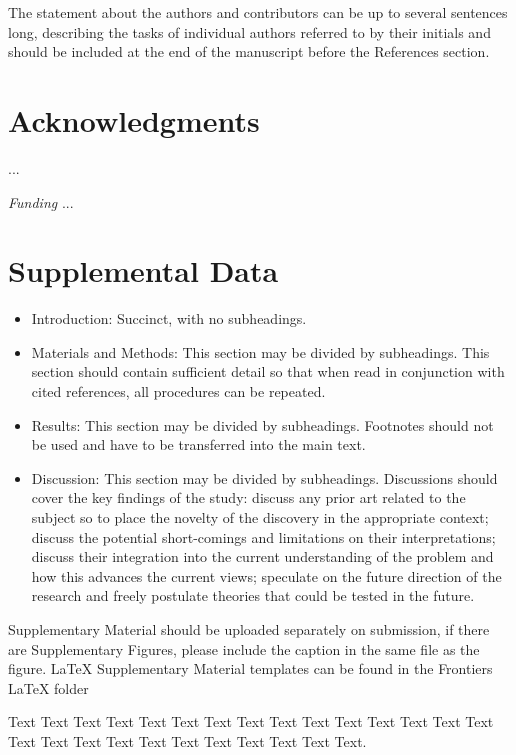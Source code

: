 \documentclass[utf8]{frontiersSCNS} %
\begin{document}
The statement about the authors and contributors can be up to several sentences long, describing the tasks of individual authors referred to by their initials and should be included at the end of the manuscript before the References section.


\section*{Acknowledgments}
... 


\textit{Funding\textcolon} 
...

\section*{Supplemental Data}

\begin{itemize}
\item Introduction: Succinct, with no subheadings.
\item Materials and Methods: This section may be divided by subheadings. This section should contain sufficient detail so that when read in conjunction with cited references, all procedures can be repeated.
\item Results: This section may be divided by subheadings. Footnotes should not be used and have to be transferred into the main text.
\item Discussion: This section may be divided by subheadings. Discussions should cover the key findings of the study: discuss any prior art related to the subject so to place the novelty of the discovery in the appropriate context; discuss the potential short-comings and limitations on their interpretations; discuss their integration into the current understanding of the problem and how this advances the current views; speculate on the future direction of the research and freely postulate theories that could be tested in the future.
\end{itemize}

Supplementary Material should be uploaded separately on submission, if there are Supplementary Figures, please include the caption in the same file as the figure. LaTeX Supplementary Material templates can be found in the Frontiers LaTeX folder

Text Text Text Text Text Text  Text Text Text Text Text Text Text Text  Text Text Text Text Text Text Text Text Text  Text Text Text.



\end{document}
